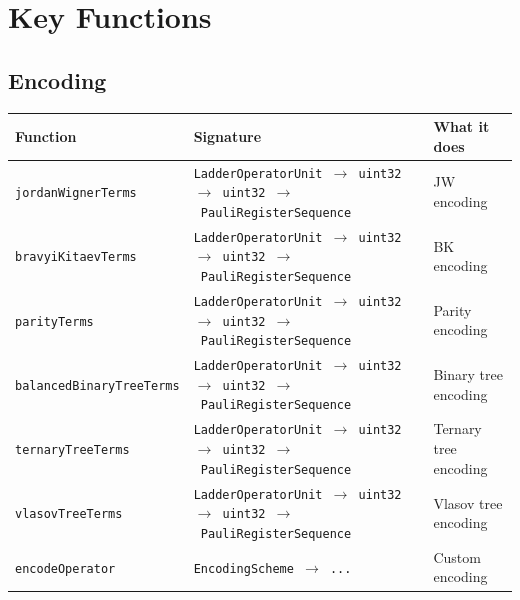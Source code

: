 \documentclass[
  11pt,
  oneside]{book}
\begin{document}
\section{Key Functions}\label{key-functions}

\subsection{Encoding}\label{encoding}

\begin{longtable}[]{@{}
  >{\raggedright\arraybackslash}p{}
  >{\raggedright\arraybackslash}p{}
  >{\raggedright\arraybackslash}p{}@{}}
\toprule\noalign{}
\begin{minipage}[b]{\linewidth}\raggedright
Function
\end{minipage} & \begin{minipage}[b]{\linewidth}\raggedright
Signature
\end{minipage} & \begin{minipage}[b]{\linewidth}\raggedright
What it does
\end{minipage} \\
\midrule\noalign{}
\endhead
\bottomrule\noalign{}
\endlastfoot
\texttt{jordanWignerTerms} &
\texttt{LadderOperatorUnit\ $\rightarrow$\ uint32\ $\rightarrow$\ uint32\ $\rightarrow$\ PauliRegisterSequence}
& JW encoding \\
\texttt{bravyiKitaevTerms} &
\texttt{LadderOperatorUnit\ $\rightarrow$\ uint32\ $\rightarrow$\ uint32\ $\rightarrow$\ PauliRegisterSequence}
& BK encoding \\
\texttt{parityTerms} &
\texttt{LadderOperatorUnit\ $\rightarrow$\ uint32\ $\rightarrow$\ uint32\ $\rightarrow$\ PauliRegisterSequence}
& Parity encoding \\
\texttt{balancedBinaryTreeTerms} &
\texttt{LadderOperatorUnit\ $\rightarrow$\ uint32\ $\rightarrow$\ uint32\ $\rightarrow$\ PauliRegisterSequence}
& Binary tree encoding \\
\texttt{ternaryTreeTerms} &
\texttt{LadderOperatorUnit\ $\rightarrow$\ uint32\ $\rightarrow$\ uint32\ $\rightarrow$\ PauliRegisterSequence}
& Ternary tree encoding \\
\texttt{vlasovTreeTerms} &
\texttt{LadderOperatorUnit\ $\rightarrow$\ uint32\ $\rightarrow$\ uint32\ $\rightarrow$\ PauliRegisterSequence}
& Vlasov tree encoding \\
\texttt{encodeOperator} & \texttt{EncodingScheme\ $\rightarrow$\ ...} & Custom
encoding \\
\end{longtable}
\end{document}
